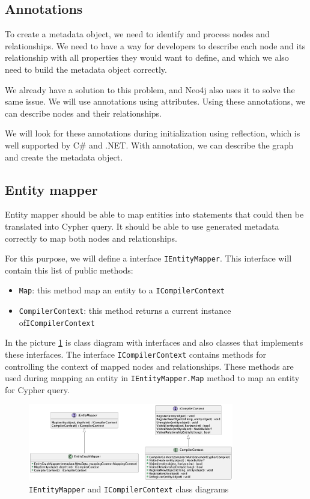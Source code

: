 \subsection {Annotations}

To create a metadata object, we need to identify and process nodes and relationships. We need to have a way for developers to describe each node and its relationship with all properties they would want to define, and which we also need to build the metadata object correctly.

We already have a solution to this problem, and Neo4j also uses it to solve the same issue. We will use annotations using attributes. Using these annotations, we can describe nodes and their relationships.

We will look for these annotations during initialization using reflection, which is well supported by C\# and .NET. With annotation, we can describe the graph and create the metadata object.

\subsection {Entity mapper}

Entity mapper should be able to map entities into statements that could then be translated into Cypher query. It should be able to use generated metadata correctly
to map both nodes and relationships.

For this purpose, we will define a interface \texttt{IEntityMapper}. This interface will contain
this list of public methods:

\begin{itemize}
    \item {\texttt{Map}: this method map an entity to a \texttt{ICompilerContext}}
    \item {\texttt{CompilerContext}: this method returns a current instance of\linebreak\texttt{ICompilerContext}}
\end{itemize}

In the picture \ref{fig:IEntityMapperClassDiagram} is class diagram with interfaces and also classes that implements these interfaces.
The interface \texttt{ICompilerContext} contains methods for controlling the context of mapped nodes and relationships. These methods
are used during mapping an entity in \texttt{IEntityMapper.Map} method to map an entity for Cypher query.

\begin{figure}[H]
    \centering
    \includegraphics[width=0.8\textwidth]{content/entitymapper.png}
    \caption{\texttt{IEntityMapper} and \texttt{ICompilerContext} class diagrams}
    \label{fig:IEntityMapperClassDiagram}
\end{figure}

